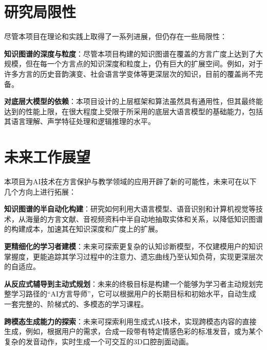 \section{研究局限性}
尽管本项目在理论和实践上取得了一系列进展，但仍存在一些局限性：

\textbf{知识图谱的深度与粒度}：尽管本项目构建的知识图谱在覆盖的方言广度上达到了大规模，但在每一个方言点的知识深度和粒度上，仍有巨大的扩展空间。例如，对于许多方言的历史音韵演变、社会语言学变体等更深层次的知识，目前的覆盖尚不完备。

\textbf{对底层大模型的依赖}：本项目设计的上层框架和算法虽然具有通用性，但其最终能达到的性能上限，在很大程度上受限于所采用的底层大语言模型的基础能力，包括其语言理解、声学特征处理和逻辑推理的水平。


\section{未来工作展望}
本项目为AI技术在方言保护与教学领域的应用开辟了新的可能性，未来可在以下几个方向上进行拓展：

\textbf{知识图谱的半自动化构建}：研究如何利用大语言模型、语音识别和计算机视觉等技术，从海量的方言文献、音视频资料中半自动地抽取实体和关系，以降低知识图谱的构建成本，加速其在知识深度和广度上的扩展。

\textbf{更精细化的学习者建模}：未来可探索更复杂的认知诊断模型，不仅建模用户的知识掌握度，更能追踪其学习过程中的注意力、遗忘曲线乃至认知负荷，实现更深层次的自适应。

\textbf{从反应式辅导到主动式规划}：未来的终极目标是构建一个能够为学习者主动规划完整学习路径的“AI方言导师”，它可以根据用户的长期目标和初始水平，自动生成一套完整的、阶梯式的、多模态的学习课程。

\textbf{跨模态生成能力的探索}：未来可探索利用生成式AI技术，实现跨模态内容的直接生成，例如，根据用户的需求，合成一段带有特定情感色彩的标准发音，或为某个复杂的发音动作，实时生成一个可交互的3D口腔剖面动画。
